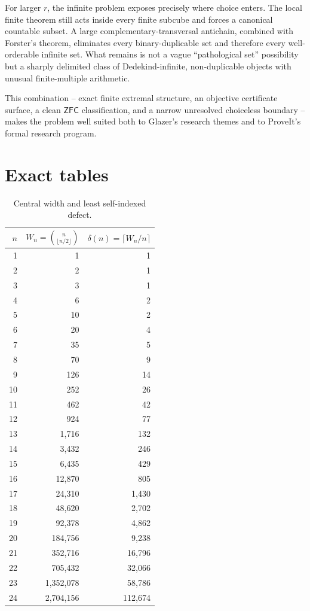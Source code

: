 \documentclass[11pt,letterpaper]{article}
\numberwithin{equation}{section}
\theoremstyle{plain}
\theoremstyle{definition}
\theoremstyle{remark}
\newcommand{\ZFC}{\mathsf{ZFC}}
\begin{document}
For larger $r$, the infinite problem exposes precisely where choice enters.
The local finite theorem still acts inside every finite subcube and forces a
canonical countable subset.  A large complementary-transversal antichain,
combined with Forster's theorem, eliminates every binary-duplicable set and
therefore every well-orderable infinite set.  What remains is not a vague
``pathological set'' possibility but a sharply delimited class of
Dedekind-infinite, non-duplicable objects with unusual finite-multiple
arithmetic.

This combination -- exact finite extremal structure, an objective certificate
surface, a clean $\ZFC$ classification, and a narrow unresolved choiceless
boundary -- makes the problem well suited both to Glazer's research themes
and to ProveIt's formal research program.

\appendix
\section{Exact tables}\label{bwc:app:tables}

\begin{table}[H]
\centering
\caption{Central width and least self-indexed defect.}
\label{bwc:tab:defects}
\begin{tabular}{r@{\qquad}r@{\qquad}r}
\toprule
$n$ & $W_n=\binom n{\lfloor n/2\rfloor}$ & $\delta(n)=\lceil W_n/n\rceil$\\
\midrule
1 & 1 & 1 \\
2 & 2 & 1 \\
3 & 3 & 1 \\
4 & 6 & 2 \\
5 & 10 & 2 \\
6 & 20 & 4 \\
7 & 35 & 5 \\
8 & 70 & 9 \\
9 & 126 & 14 \\
10 & 252 & 26 \\
11 & 462 & 42 \\
12 & 924 & 77 \\
13 & 1{,}716 & 132 \\
14 & 3{,}432 & 246 \\
15 & 6{,}435 & 429 \\
16 & 12{,}870 & 805 \\
17 & 24{,}310 & 1{,}430 \\
18 & 48{,}620 & 2{,}702 \\
19 & 92{,}378 & 4{,}862 \\
20 & 184{,}756 & 9{,}238 \\
21 & 352{,}716 & 16{,}796 \\
22 & 705{,}432 & 32{,}066 \\
23 & 1{,}352{,}078 & 58{,}786 \\
24 & 2{,}704{,}156 & 112{,}674 \\
\bottomrule
\end{tabular}
\end{table}
\end{document}
